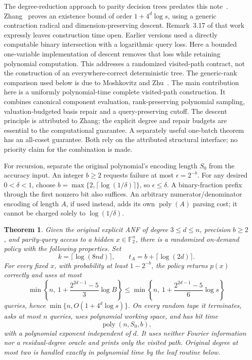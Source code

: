 \documentclass[11pt]{article}
\newtheorem{theorem}{Theorem}
\theoremstyle{remark}\newtheorem{remark}[theorem]{Remark}
\newcommand{\F}{\mathbb F}
\begin{document}
The degree-reduction approach to parity decision trees predates this note~\cite{TWXZ}.
Zhang~\cite{Z26} proves an existence bound of order $1+4^d\log s$, using a generic contraction radical and dimension-preserving descent. Remark~3.17 of that work expressly leaves construction time open. Earlier versions used a directly computable binary intersection with a logarithmic query loss. Here a bounded one-variable implementation of descent removes that loss while retaining polynomial computation. This addresses a randomized visited-path contract, not the construction of an everywhere-correct deterministic tree.
The generic-rank comparison used below is due to Moshkovitz and Zhu~\cite{MZ}.
The main contribution here is a uniformly polynomial-time complete visited-path construction. It combines canonical component evaluation, rank-preserving polynomial sampling, valuation-budgeted basis repair and a query-preserving cutoff. The descent principle is attributed to Zhang; the explicit degree and repair budgets are essential to the computational guarantee. A separately useful one-batch theorem has an all-coset guarantee. Both rely on the attributed structural interface; no priority claim for the combination is made.

For recursion, separate the original polynomial's encoding length $S_0$ from the accuracy input. An integer $b\ge2$ requests failure at most $\epsilon=2^{-b}$. For any desired $0<\delta<1$, choose $b=\max\{2,\lceil\log(1/\delta)\rceil\}$, so $\epsilon\le\delta$. A binary-fraction prefix through the first nonzero bit also suffices. An arbitrary numerator/denominator encoding of length $A$, if used instead, adds its own $\operatorname{poly}(A)$ parsing cost; it cannot be charged solely to $\log(1/\delta)$.

\begin{theorem}\label{thm:recursive}
Given the original explicit ANF of degree $3\le d\le n$, precision $b\ge2$, and parity-query access to a hidden $x\in\F_2^n$, there is a randomized on-demand policy with the following properties. Set
\[
 k=\lceil\log(8nd)\rceil,\qquad
 t_A=b+\lceil\log(2d)\rceil.
\]
For every fixed $x$, with probability at least $1-2^{-b}$, the policy returns $p(x)$ correctly and uses at most
\begin{equation}\label{eq:recursivequeries}
 \min\left\{n,\ 1+\frac{2^{2d-1}-5}{3}\log B\right\}
 \le \min\left\{n,\ 1+\frac{2^{2d-1}-5}{6}\log s\right\}
\end{equation}
queries, hence $\min\{n,O(1+4^d\log s)\}$. On every random tape it terminates, asks at most $n$ queries, uses polynomial working space, and has bit time
\[
 \operatorname{poly}(n,S_0,b),
\]
with a polynomial exponent independent of $d$. It uses neither Fourier information nor a residual-degree oracle and prints only the visited path. Original degree at most two is handled exactly in polynomial time by the leaf routine below.
\end{theorem}
\end{document}
